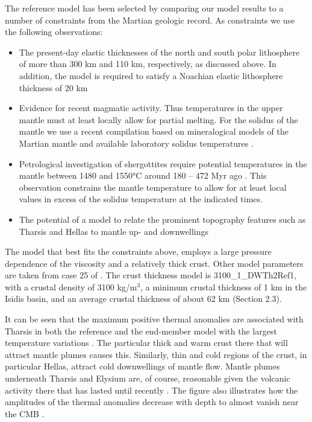 %
The reference model has been selected by comparing our model results to a number of constraints from the Martian geologic record. As constraints we use the following observations: 
\begin{itemize}
\item	The present-day elastic thicknesses of the north and south polar lithosphere of more than 300 km and 110 km, respectively, as discussed above. In addition, the model is required to satisfy a Noachian elastic lithosphere thickness of 20 km \citep[][and references therein]{Grott2013} 
\item	Evidence for recent magmatic activity. Thus temperatures in the upper mantle must at least locally allow for partial melting. For the solidus of the mantle we use a recent compilation based on mineralogical models of the Martian mantle and available laboratory solidus temperatures \citep{Ruedas2017}.
\item	Petrological investigation of shergottites require potential temperatures in the mantle between 1480 and 1550°C around 180 -- 472 Myr ago \citep{Filiberto2015}. This observation constrains the mantle temperature to allow for at least local values in excess of the solidus temperature at the indicated times. 
\item	The potential of a model to relate the prominent topography features such as Tharsis and Hellas to mantle up- and downwellings

\end{itemize}

The model that best fits the constraints above, employs a large pressure dependence of the viscosity and a relatively thick crust. Other model parameters are taken from case 25 of \citet{Plesa2016}. The crust thickness model is 3100\_1\_DWTh2Ref1, with a crustal density of 3100 kg/m$^3$, a minimum crustal thickness of 1 km in the Isidis basin, and an average crustal thickness of about 62 km (Section 2.3). 

It can be seen that the maximum positive thermal anomalies are associated with Tharsis in both the reference and the end-member model with the largest temperature variations . The particular thick and warm crust there that will attract mantle plumes causes this. Similarly, thin and cold regions of the crust, in particular Hellas, attract cold downwellings of mantle flow. Mantle plumes underneath Tharsis and Elysium are, of course, reasonable given the volcanic activity there that has lasted until recently \citep[e.g.,][]{Werner2009}. The figure also illustrates how the amplitudes of the thermal anomalies decrease with depth  to almost vanish near the CMB .

